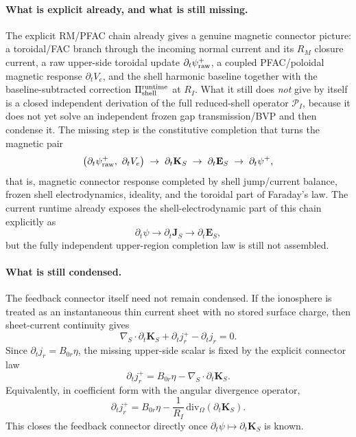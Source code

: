 \documentclass[11pt,a4paper]{article}
\begin{document}
 \paragraph{What is explicit already, and what is still missing.}
The explicit RM/PFAC chain already gives a genuine magnetic connector picture:
a toroidal/FAC branch through the incoming normal current and its \(R_M\)
closure current, a raw upper-side toroidal update
\(\partial_t\psi_{\rm raw}^+\), a coupled PFAC/poloidal magnetic response
\(\partial_t V_e\), and the shell harmonic baseline together with the
baseline-subtracted correction \(\Pi_{\rm shell}^{\rm runtime}\) at \(R_I\).
What it still does \emph{not} give by itself is a closed independent
derivation of the full reduced-shell operator \(\mathcal P_I\), because it
does not yet solve an independent frozen gap transmission/BVP and then
condense it. The missing step is the constitutive completion that turns the
magnetic pair
\[
\bigl(\partial_t\psi_{\rm raw}^+,\ \partial_t V_e\bigr)
\;\to\;
\partial_t \mathbf K_S
\;\to\;
\partial_t \mathbf E_S
\;\to\;
\partial_t\psi^+,
\]
that is, magnetic connector response completed by shell jump/current balance,
frozen shell electrodynamics, ideality, and the toroidal part of Faraday's
law. The current runtime already exposes the shell-electrodynamic part of this
chain explicitly as
\[
\partial_t\psi \to \partial_t\mathbf J_S \to \partial_t\mathbf E_S,
\]
but the fully independent upper-region completion law is still not assembled.

\paragraph{What is still condensed.}
The feedback connector itself need not remain condensed. If the ionosphere is
treated as an instantaneous thin current sheet with no stored surface charge,
then sheet-current continuity gives
\[
\nabla_S\cdot \partial_t\mathbf K_S + \partial_t j_r^+ - \partial_t j_r = 0.
\]
Since \(\partial_t j_r = B_{0r}\eta\), the missing upper-side scalar is fixed
by the explicit connector law
\begin{equation}
\partial_t j_r^+
=
B_{0r}\eta - \nabla_S\cdot \partial_t\mathbf K_S.
\label{eq:thin_shell_current_continuity_connector}
\end{equation}
Equivalently, in coefficient form with the angular divergence operator,
\[
\partial_t j_r^+
=
B_{0r}\eta - \frac{1}{R_I}\,\mathrm{div}_\Omega(\partial_t\mathbf K_S).
\]
This closes the feedback connector directly once
\(\partial_t\psi\mapsto\partial_t\mathbf K_S\) is known.
\end{document}
